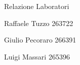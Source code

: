\begin{titlepage}
	{ \Huge \textsf{Relazione Laboratori}}\\[0.7 cm] %
\begin{flushright}
	Raffaele Tuzzo 263722
\end{flushright}
\begin{flushright}
	Giulio Pecoraro	266391
\end{flushright}
\begin{flushright}
	Luigi Massari	265396
\end{flushright}


	
	\vfill %
	\thispagestyle{empty}
\end{titlepage}